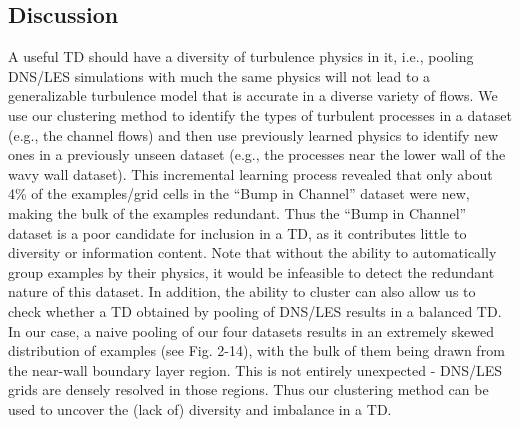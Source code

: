 %
%
%
\subsection{Discussion}
\label{subsec:discussion}
%
%
A useful TD should have a diversity of turbulence physics in it, i.e., pooling DNS/LES simulations with much the same physics will not lead to a generalizable turbulence model that is accurate in a diverse variety of ﬂows. We use our clustering method to identify the types of turbulent processes in a dataset (e.g., the channel ﬂows) and then use previously learned physics to identify new ones in a previously unseen dataset (e.g., the processes near the lower wall of the wavy wall dataset). This incremental learning process revealed that only about 4\% of the examples/grid cells in the “Bump in Channel” dataset were new, making the bulk of the examples redundant. Thus the “Bump in Channel” dataset is a poor candidate for inclusion
in a TD, as it contributes little to diversity or information content. Note that without the ability to
automatically group examples by their physics, it would be infeasible to detect the redundant nature of this dataset. In addition, the ability to cluster can also allow us to check whether a TD obtained by pooling of DNS/LES results in a balanced TD. In our case, a naive pooling of our four datasets results in an extremely skewed distribution of examples (see Fig. 2-14), with the bulk of them being drawn from the near-wall boundary layer region. This is not entirely unexpected - DNS/LES grids are densely resolved in those regions. Thus our clustering method can be used to uncover the (lack of) diversity and imbalance in a TD.

